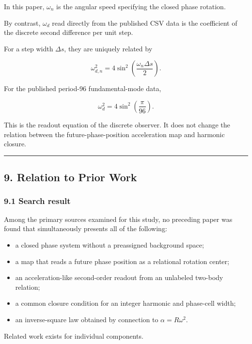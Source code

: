 \documentclass[
  a4paper,
]{article}
\providecommand{\tightlist}{%
  \setlength{\itemsep}{0pt}\setlength{\parskip}{0pt}}
\begin{document}
In this paper, \(\omega_n\) is the angular speed specifying the closed
phase rotation.

By contrast, \(\omega_d\) read directly from the published CSV data is
the coefficient of the discrete second difference per unit step.

For a step width \(\Delta s\), they are uniquely related by

\[
\omega_{d,n}^2
=4\sin^2\left(\frac{\omega_n\Delta s}{2}\right).
\]

For the published period-96 fundamental-mode data,

\[
\omega_d^2
=4\sin^2\left(\frac{\pi}{96}\right).
\]

This is the readout equation of the discrete observer. It does not
change the relation between the future-phase-position acceleration map
and harmonic closure.

\begin{center}\rule{0.5\linewidth}{0.5pt}\end{center}

\subsection{9. Relation to Prior Work}\label{relation-to-prior-work}

\subsubsection{9.1 Search result}\label{search-result}

Among the primary sources examined for this study, no preceding paper
was found that simultaneously presents all of the following:

\begin{itemize}
\tightlist
\item
  a closed phase system without a preassigned background space;
\item
  a map that reads a future phase position as a relational rotation
  center;
\item
  an acceleration-like second-order readout from an unlabeled two-body
  relation;
\item
  a common closure condition for an integer harmonic and phase-cell
  width;
\item
  an inverse-square law obtained by connection to \(\alpha=R\omega^2\).
\end{itemize}

Related work exists for individual components.
\end{document}
